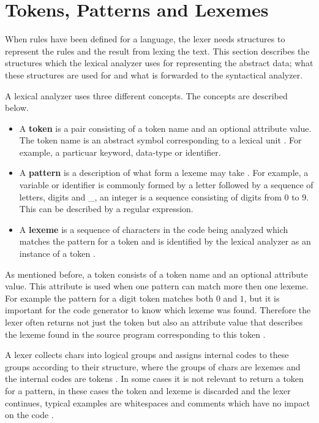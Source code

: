 \section{Tokens, Patterns and Lexemes}
When rules have been defined for a language, the lexer needs structures to
represent the rules and the result from lexing the text.
This section describes the structures which the lexical analyzer uses
for representing the abstract data; what these structures are used for and what is
forwarded to the syntactical analyzer.

A lexical analyzer uses three different concepts. The concepts are described
below.
\begin{itemize}
  \item A \textbf{token} is a pair consisting of a token name and an optional attribute value. The
token name is an abstract symbol corresponding to a lexical unit \cite{Aho2006}.
For example, a particuar keyword, data-type or identifier.
  \item A \textbf{pattern} is a description of what form a lexeme may take \cite{Aho2006}.
For example, a variable or identifier is commonly formed by a letter followed by
a sequence of letters, digits and \_, an integer is a sequence consisting of
digits from 0 to 9. This can be described by a regular expression.
  \item A \textbf{lexeme} is a sequence of characters in the code being analyzed which
matches the pattern for a token and is identified by the lexical analyzer as an
instance of a token \cite{Aho2006}.
\end{itemize}
As mentioned before, a token consists of a token name and an optional attribute value.
This attribute is used when one pattern can match more then one lexeme.
For example the pattern for a digit token matches both $0$ and $1$,
but it is important for the code generator to know which lexeme was found.
Therefore the lexer often returns not just the token but also an attribute value
that describes the lexeme found in the source program corresponding to this
token \cite{Aho2006}.

A lexer collects chars into logical groups and assigns 
internal codes to these groups according to their structure, 
where the groups of chars are lexemes and the internal codes are tokens \cite{sebesta2012}.
In some cases it is not relevant to return a token for a pattern, in these
cases the token and lexeme is discarded and the lexer continues,
typical examples are whitespaces and comments which have no impact on
the code \cite{Aho2006}.


